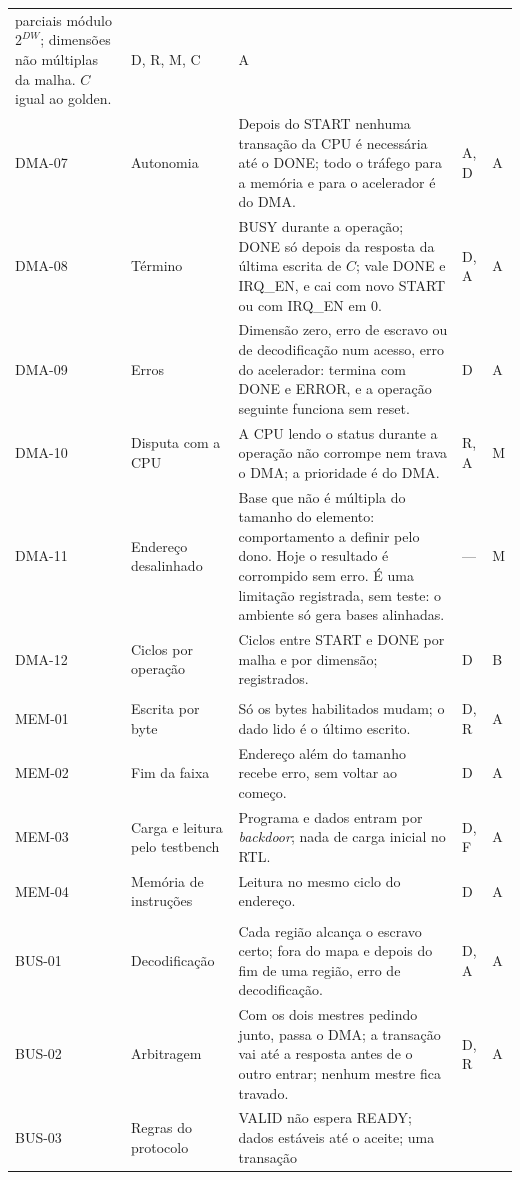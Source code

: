 \documentclass[10pt,a4paper]{article}
\newcommand{\DW}{\mathit{DW}}
\newcommand{\code}[1]{\texttt{\detokenize{#1}}}
\begin{document}
{\begin{longtable}{@{}L{1.35cm}L{2.45cm}L{8.3cm}L{1.25cm}L{0.55cm}@{}}
parciais módulo $2^{\DW}$; dimensões não múltiplas da malha. $C$ igual ao golden. & D, R, M, C & A\\
DMA-07 & Autonomia & Depois do START nenhuma transação da CPU é necessária até o DONE; todo o
tráfego para a memória e para o acelerador é do DMA. & A, D & A\\
DMA-08 & Término & BUSY durante a operação; DONE só depois da resposta da última escrita de $C$;
\code{irq_o} vale DONE e IRQ\_EN, e cai com novo START ou com IRQ\_EN em 0. & D, A & A\\
DMA-09 & Erros & Dimensão zero, erro de escravo ou de decodificação num acesso, erro do acelerador:
termina com DONE e ERROR, e a operação seguinte funciona sem reset. & D & A\\
DMA-10 & Disputa com a CPU & A CPU lendo o status durante a operação não corrompe nem trava o DMA;
a prioridade é do DMA. & R, A & M\\
DMA-11 & Endereço desalinhado & Base que não é múltipla do tamanho do elemento: comportamento a
definir pelo dono. Hoje o resultado é corrompido sem erro. É uma limitação registrada, sem teste:
o ambiente só gera bases alinhadas. &
--- & M\\
DMA-12 & Ciclos por operação & Ciclos entre START e DONE por malha e por dimensão; registrados. &
D & B\\
\\
MEM-01 & Escrita por byte & Só os bytes habilitados mudam; o dado lido é o último escrito. &
D, R & A\\
MEM-02 & Fim da faixa & Endereço além do tamanho recebe erro, sem voltar ao começo. & D & A\\
MEM-03 & Carga e leitura pelo testbench & Programa e dados entram por \emph{backdoor}; nada de
carga inicial no RTL. & D, F & A\\
MEM-04 & Memória de instruções & Leitura no mesmo ciclo do endereço. & D & A\\
\\
BUS-01 & Decodificação & Cada região alcança o escravo certo; fora do mapa e depois do fim de uma
região, erro de decodificação. & D, A & A\\
BUS-02 & Arbitragem & Com os dois mestres pedindo junto, passa o DMA; a transação vai até a
resposta antes de o outro entrar; nenhum mestre fica travado. & D, R & A\\
BUS-03 & Regras do protocolo & VALID não espera READY; dados estáveis até o aceite; uma transação

\end{longtable}}
\end{document}
